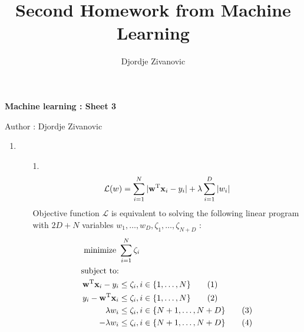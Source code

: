 \documentclass[10pt,a4paper]{article}
\author{Djordje Zivanovic}
\title{Second Homework from Machine Learning}
\begin{document}
\centerline{\large \bf Machine learning : Sheet 3}
\centerline{\large Author : Djordje Zivanovic}
\bigskip
\newcommand{\transpose}[1]{#1 ^ \text{T}}
\newcommand{\mat}[1]{\textbf{\text{{#1}}}}
\newcommand{\vect}[1]{\mat{#1}}
\newcommand{\gradient}[1]{\nabla_{\vect{#1}}}
\newcommand{\numberthis}{\addtocounter{equation}{1}\tag{\theequation}}

\begin{enumerate}
\item 
\begin{enumerate}
\item[1.]
\begin{equation}
\mathcal{L}(w) = \sum_{i=1}^N|\transpose{\vect{w}}\vect{x}_i - y_i| + \lambda\sum_{i=1}^D|w_i| \label{eq:objective}
\end{equation}
Objective function $\mathcal{L}$ is equivalent to solving the following linear program with $2D+ N$ variables $w_1, \ldots, w_D, \zeta_1,\ldots, \zeta_{N+D}$ :
	\begin{align*}
		\text{minimize  } &\sum_{i=1}^{N}\zeta_i\\
		\text{subject to:}\\
		\transpose{\vect{w}}\vect{x}_i - y_i &\leq \zeta_i, i \in \{ 1, \ldots, N \}  \numberthis \label{eq:leftAbsW}\\
		 y_i - \transpose{\vect{w}}\vect{x}_i &\leq \zeta_i, i \in \{ 1, \ldots, N\}  \numberthis \label{eq:rightAbsW} \\
		 \lambda w_i &\leq \zeta_i,  i \in \{ N + 1, \ldots, N + D\} \numberthis 
		 \label{eq:leftAbsL} \\
		 -\lambda w_i &\leq \zeta_i, i \in \{ N + 1, \ldots, N + D\} \numberthis 
		 \label{eq:rightAbsL}\\
\end{align*}
	

\end{enumerate}
\end{enumerate}
\end{document}
